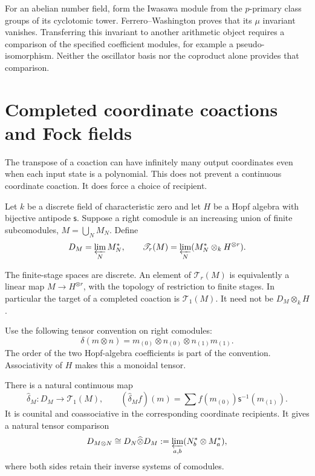 For an abelian number field, form the Iwasawa module from
the $p$-primary class groups of its cyclotomic tower.
Ferrero--Washington proves that its $\mu$ invariant vanishes.
Transferring this invariant to another
arithmetic object requires a comparison of the specified
coefficient modules, for example a pseudo-isomorphism.
Neither the oscillator basis nor the coproduct alone provides
that comparison.

\section{Completed coordinate coactions and Fock fields}
\label{v4-arith:md:sec:completed-modules}

The transpose of a coaction can have infinitely many output
coordinates even when each input state is a polynomial. This
does not prevent a continuous coordinate coaction. It does
force a choice of recipient.

Let $k$ be a discrete field of characteristic zero and let
$H$ be a Hopf algebra with bijective antipode $\mathsf s$.
Suppose a right comodule is an increasing union of finite
subcomodules, $M=\bigcup_NM_N$. Define
\begin{equation}\label{v4-arith:md:eq:coordinate-limits}
 D_M=\varprojlim_NM_N^*,\qquad
 \mathscr T_r(M)=\varprojlim_N(M_N^*\otimes_kH^{\otimes r}).
\end{equation}

The finite-stage spaces are discrete. An element of
$\mathscr T_r(M)$ is equivalently a linear map
$M\to H^{\otimes r}$, with the topology of restriction to
finite stages. In particular the target of a completed
coaction is $\mathscr T_1(M)$. It need not be
$D_M\otimes_kH$.

Use the following tensor convention on right comodules:
\begin{equation}\label{v4-arith:md:eq:reversed-tails}
 \delta(m\otimes n)
 =m_{(0)}\otimes n_{(0)}\otimes n_{(1)}m_{(1)}.
\end{equation}
The order of the two Hopf-algebra coefficients is part of the
convention. Associativity of $H$ makes this a monoidal tensor.

\begin{proposition}
\label{v4-arith:md:prop:completed-coaction}
There is a natural continuous map
\begin{equation}\label{v4-arith:md:eq:completed-coaction}
 \widehat\delta_M:D_M\longrightarrow\mathscr T_1(M),
 \qquad (\widehat\delta_Mf)(m)
 =\sum f(m_{(0)})\mathsf s^{-1}(m_{(1)}).
\end{equation}
It is counital and coassociative in the corresponding
coordinate recipients. It gives a natural tensor comparison
\[
 D_{M\otimes N}\cong
 D_N\widehat\otimes D_M
 :=\varprojlim_{a,b}(N_b^*\otimes M_a^*),
\]
where both sides retain their inverse systems of comodules.
\end{proposition}

